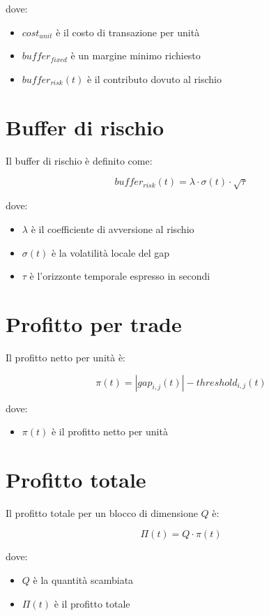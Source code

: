 \documentclass[10pt,final]{article}
\begin{document}
dove:
\begin{itemize}
    \item $cost_{unit}$ è il costo di transazione per unità
    \item $buffer_{fixed}$ è un margine minimo richiesto
    \item $buffer_{risk}(t)$ è il contributo dovuto al rischio
\end{itemize}


\section{Buffer di rischio}

Il buffer di rischio è definito come:

\[
buffer_{risk}(t) = \lambda \cdot \sigma(t) \cdot \sqrt{\tau}
\]

dove:
\begin{itemize}
    \item $\lambda$ è il coefficiente di avversione al rischio
    \item $\sigma(t)$ è la volatilità locale del gap
    \item $\tau$ è l'orizzonte temporale espresso in secondi
\end{itemize}


\section{Profitto per trade}

Il profitto netto per unità è:

\[
\pi(t) = |gap_{i,j}(t)| - threshold_{i,j}(t)
\]

dove:
\begin{itemize}
    \item $\pi(t)$ è il profitto netto per unità
\end{itemize}


\section{Profitto totale}

Il profitto totale per un blocco di dimensione $Q$ è:

\[
\Pi(t) = Q \cdot \pi(t)
\]

dove:
\begin{itemize}
    \item $Q$ è la quantità scambiata
    \item $\Pi(t)$ è il profitto totale
\end{itemize}
\end{document}

